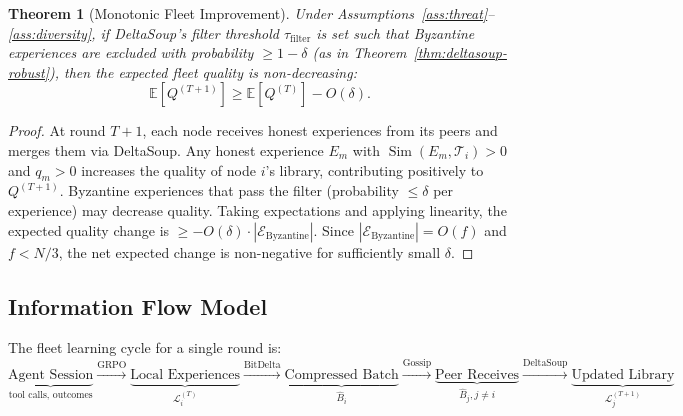 \documentclass[11pt]{article}
\newtheorem{theorem}{Theorem}
\DeclareMathOperator{\Sim}{Sim}
\begin{document}
\begin{theorem}[Monotonic Fleet Improvement]
\label{thm:monotone}
Under Assumptions~\ref{ass:threat}--\ref{ass:diversity}, if DeltaSoup's
filter threshold $\tau_{\text{filter}}$ is set such that Byzantine experiences
are excluded with probability $\geq 1 - \delta$ (as in
Theorem~\ref{thm:deltasoup-robust}), then the expected fleet quality is
non-decreasing:
\begin{equation}
    \mathbb{E}\left[Q^{(T+1)}\right] \geq \mathbb{E}\left[Q^{(T)}\right]
    - O(\delta).
    \label{eq:monotone}
\end{equation}
\end{theorem}

\begin{proof}
At round $T+1$, each node receives honest experiences from its peers and
merges them via DeltaSoup. Any honest experience $E_m$ with $\Sim(E_m,
\mathcal{T}_i) > 0$ and $q_m > 0$ increases the quality of node $i$'s
library, contributing positively to $Q^{(T+1)}$. Byzantine experiences that
pass the filter (probability $\leq \delta$ per experience) may decrease
quality. Taking expectations and applying linearity, the expected quality
change is $\geq -O(\delta) \cdot |\mathcal{E}_{\text{Byzantine}}|$. Since
$|\mathcal{E}_{\text{Byzantine}}| = O(f)$ and $f < N/3$, the net expected
change is non-negative for sufficiently small $\delta$.
\end{proof}

\subsection{Information Flow Model}

The fleet learning cycle for a single round is:
\begin{equation}
    \underbrace{\text{Agent Session}}_{\text{tool calls, outcomes}}
    \xrightarrow{\text{GRPO}}
    \underbrace{\text{Local Experiences}}_{\mathcal{L}_i^{(T)}}
    \xrightarrow{\text{BitDelta}}
    \underbrace{\text{Compressed Batch}}_{\hat{B}_i}
    \xrightarrow{\text{Gossip}}
    \underbrace{\text{Peer Receives}}_{\hat{B}_j, j \neq i}
    \xrightarrow{\text{DeltaSoup}}
    \underbrace{\text{Updated Library}}_{\mathcal{L}_j^{(T+1)}}
    \label{eq:info-flow}
\end{equation}
\end{document}
